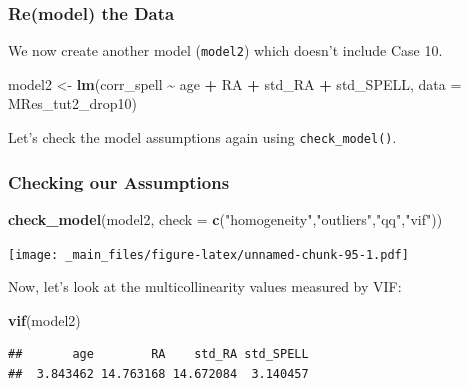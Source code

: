\documentclass[
]{book}
\newenvironment{Shaded}{\begin{snugshade}}{\end{snugshade}}
\newcommand{\AttributeTok}[1]{\textcolor[rgb]{0.13,0.29,0.53}{#1}}
\newcommand{\FunctionTok}[1]{\textcolor[rgb]{0.13,0.29,0.53}{\textbf{#1}}}
\newcommand{\NormalTok}[1]{#1}
\newcommand{\OtherTok}[1]{\textcolor[rgb]{0.56,0.35,0.01}{#1}}
\newcommand{\SpecialCharTok}[1]{\textcolor[rgb]{0.81,0.36,0.00}{\textbf{#1}}}
\newcommand{\StringTok}[1]{\textcolor[rgb]{0.31,0.60,0.02}{#1}}
\begin{document}
\hypertarget{remodel-the-data}{%
\subsubsection*{Re(model) the Data}\label{remodel-the-data}}

We now create another model (\texttt{model2}) which doesn't include Case 10.

\begin{Shaded}
\begin{Highlighting}[]
\NormalTok{model2 }\OtherTok{\textless{}{-}} \FunctionTok{lm}\NormalTok{(corr\_spell }\SpecialCharTok{\textasciitilde{}}\NormalTok{ age }\SpecialCharTok{+}\NormalTok{ RA }\SpecialCharTok{+}\NormalTok{ std\_RA }\SpecialCharTok{+}\NormalTok{ std\_SPELL, }\AttributeTok{data =}\NormalTok{ MRes\_tut2\_drop10)}
\end{Highlighting}
\end{Shaded}

Let's check the model assumptions again using \texttt{check\_model()}.

\hypertarget{checking-our-assumptions-2}{%
\subsubsection*{Checking our Assumptions}\label{checking-our-assumptions-2}}

\begin{Shaded}
\begin{Highlighting}[]
\FunctionTok{check\_model}\NormalTok{(model2, }\AttributeTok{check =} \FunctionTok{c}\NormalTok{(}\StringTok{"homogeneity"}\NormalTok{,}\StringTok{"outliers"}\NormalTok{,}\StringTok{"qq"}\NormalTok{,}\StringTok{"vif"}\NormalTok{))}
\end{Highlighting}
\end{Shaded}

\texttt{[image: \_main\_files/figure-latex/unnamed-chunk-95-1.pdf]}

Now, let's look at the multicollinearity values measured by VIF:

\begin{Shaded}
\begin{Highlighting}[]
\FunctionTok{vif}\NormalTok{(model2)}
\end{Highlighting}
\end{Shaded}

\begin{verbatim}
##       age        RA    std_RA std_SPELL 
##  3.843462 14.763168 14.672084  3.140457
\end{verbatim}
\end{document}
